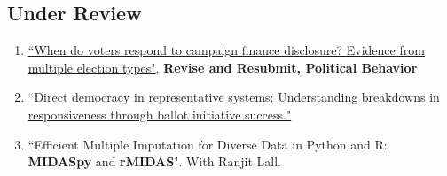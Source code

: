\documentclass[11pt, a4paper]{article}
\begin{document}
\subsection*{Under Review}

\begin{enumerate}  

  \item \href{https://ts-robinson.com/publication/robinson-whenvotersrespond-2021/robinson-whenvotersrespond-2021.pdf}{``When do voters respond to campaign finance disclosure? Evidence from multiple election types"}, \textbf{Revise and Resubmit, Political Behavior}

  \item \href{https://ts-robinson.com/publication/robinson-directdemocracyrepresentative-2021/robinson-directdemocracyrepresentative-2021.pdf}{``Direct democracy in representative systems: Understanding breakdowns in responsiveness through ballot initiative success."}

  \item ``Efficient Multiple Imputation for Diverse Data in Python and R: \textbf{MIDASpy} and \textbf{rMIDAS}". With Ranjit Lall.


\end{enumerate}
\end{document}
